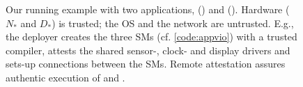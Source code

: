 \begin{figure}
  \begin{centering}
  \resizebox{0.70\linewidth}{!}{}
  \end{centering}
  \vspace{-3mm}
  \caption{%
    Our running example with two applications, \appavl{} () and
\appvio{} (). Hardware ($N_{*}$ and $D_{*}$) is trusted; the OS and
the network are untrusted. E.g., the \appvio{} deployer creates the three
 \acp{SM} (cf. \cref{code:appvio}) with a trusted compiler, attests
the shared sensor-, clock- and display drivers and sets-up connections between
the \acp{SM}. Remote attestation assures authentic execution of \appavl{} and
\appvio{}. } %
  \label{fig_model}
  \vspace{-3mm}
\end{figure}

